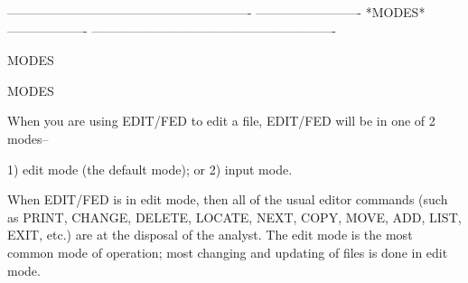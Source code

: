  
 
 
 
 
 
 
 
 
 
 
 
 
 
 
 
 
 
 
 
 
 
 
 
 
 
 
 
 
 
 
 
 
 
 
 
 
 
 
 
 
 
 
 
 
 
 
 
 
 
 
 
 
 
 
 
 
 
 
 
 
 
 
 
 
 
 
 
 
 
 
 
 
 
 
 
 
 
 
 
 
 
 
 
 
 
 
 
----------------------------------------------------------
-------------------------  *MODES*  -------------------
----------------------------------------------------------
 
MODES
 
MODES
 
   When you are using EDIT/FED to edit a file,
   EDIT/FED will be in one of 2 modes--
 
      1) edit  mode (the default mode); or
      2) input mode.
 
   When EDIT/FED is in    edit mode,
   then all of the usual editor commands
   (such as PRINT, CHANGE, DELETE, LOCATE,
   NEXT, COPY, MOVE, ADD, LIST, EXIT, etc.)
   are at the disposal of the analyst.
   The     edit mode    is the most common
   mode of operation; most changing and updating
   of files is done in    edit mode.
 
